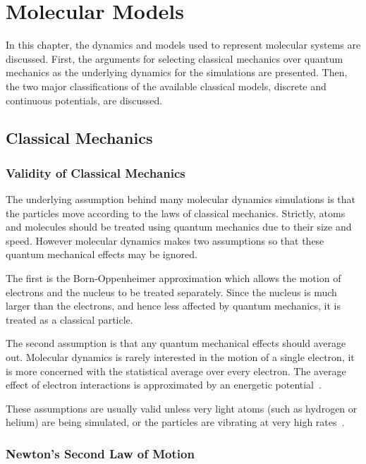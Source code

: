 \documentclass[12pt]{UoAthesis} \usepackage{booktabs}
\begin{document}
\printbibliography[heading=thesisChapterBib] 

\chapter{Molecular Models}
In this chapter, the dynamics and models used to represent molecular
systems are discussed. First, the arguments for selecting classical
mechanics over quantum mechanics as the underlying dynamics for the
simulations are presented.  Then, the two major classifications of the
available classical models, discrete and continuous potentials, are
discussed.

\section{Classical Mechanics}

\subsection{Validity of Classical Mechanics}

The underlying assumption behind many molecular dynamics simulations
is that the particles move according to the laws of classical
mechanics. Strictly, atoms and molecules should be treated using
quantum mechanics due to their size and speed.  However molecular
dynamics makes two assumptions so that these quantum mechanical
effects may be ignored.

The first is the Born-Oppenheimer approximation which allows the
motion of electrons and the nucleus to be treated separately.  Since
the nucleus is much larger than the electrons, and hence less affected
by quantum mechanics, it is treated as a classical particle.  

The second assumption is that any quantum mechanical effects should
average out. Molecular dynamics is rarely interested in the motion of
a single electron, it is more concerned with the statistical average
over every electron.  The average effect of electron interactions is
approximated by an energetic potential~\cite{Jasper2006}.

These assumptions are usually valid unless very light atoms (such as
hydrogen or helium) are being simulated, or the particles are vibrating
at very high rates~\cite{Frenkel2002}.

\subsection{Newton's Second Law of Motion \label{NewtonLaw}}
\end{document}
